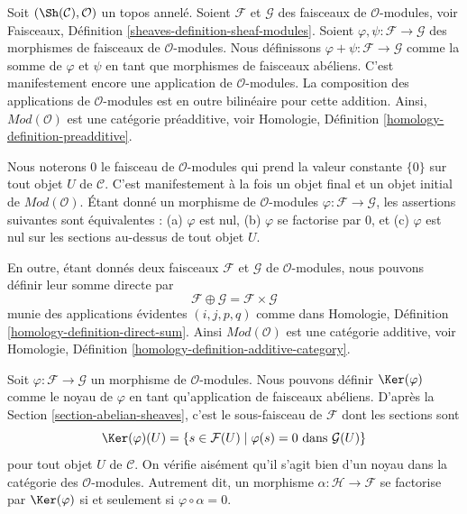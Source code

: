 \noindent
Soit $(\Sh(\mathcal{C}), \mathcal{O})$ un topos annelé. Soient
$\mathcal{F}$ et $\mathcal{G}$ des faisceaux de $\mathcal{O}$-modules, voir
Faisceaux, Définition \ref{sheaves-definition-sheaf-modules}. Soient
$\varphi, \psi : \mathcal{F} \to \mathcal{G}$ des morphismes de faisceaux de
$\mathcal{O}$-modules. Nous définissons
$\varphi + \psi : \mathcal{F} \to \mathcal{G}$ comme la somme de $\varphi$ et
$\psi$ en tant que morphismes de faisceaux abéliens. C'est manifestement encore
une application de $\mathcal{O}$-modules. La composition des applications de
$\mathcal{O}$-modules est en outre bilinéaire pour cette addition. Ainsi,
$\textit{Mod}(\mathcal{O})$ est une catégorie préadditive, voir Homologie,
Définition \ref{homology-definition-preadditive}.

\medskip\noindent
Nous noterons $0$ le faisceau de $\mathcal{O}$-modules qui prend la valeur
constante $\{0\}$ sur tout objet $U$ de $\mathcal{C}$. C'est manifestement à
la fois un objet final et un objet initial de $\textit{Mod}(\mathcal{O})$.
Étant donné un morphisme de $\mathcal{O}$-modules
$\varphi : \mathcal{F} \to \mathcal{G}$, les assertions suivantes sont
équivalentes : (a) $\varphi$ est nul, (b) $\varphi$ se factorise par $0$, et
(c) $\varphi$ est nul sur les sections au-dessus de tout objet $U$.

\medskip\noindent
En outre, étant donnés deux faisceaux $\mathcal{F}$ et $\mathcal{G}$ de
$\mathcal{O}$-modules, nous pouvons définir leur somme directe par
$$
\mathcal{F} \oplus \mathcal{G} = \mathcal{F} \times \mathcal{G}
$$
munie des applications évidentes $(i, j, p, q)$ comme dans Homologie,
Définition \ref{homology-definition-direct-sum}. Ainsi
$\textit{Mod}(\mathcal{O})$ est une catégorie additive, voir Homologie,
Définition \ref{homology-definition-additive-category}.

\medskip\noindent
Soit $\varphi : \mathcal{F} \to \mathcal{G}$ un morphisme de
$\mathcal{O}$-modules. Nous pouvons définir $\Ker(\varphi)$ comme le noyau de
$\varphi$ en tant qu'application de faisceaux abéliens. D'après la Section
\ref{section-abelian-sheaves}, c'est le sous-faisceau de $\mathcal{F}$ dont les
sections sont
$$
\Ker(\varphi)(U) =
\{ s \in \mathcal{F}(U) \mid \varphi(s) = 0 \text{ dans } \mathcal{G}(U)\}
$$
pour tout objet $U$ de $\mathcal{C}$. On vérifie aisément qu'il s'agit bien
d'un noyau dans la catégorie des $\mathcal{O}$-modules. Autrement dit, un
morphisme $\alpha : \mathcal{H} \to \mathcal{F}$ se factorise par
$\Ker(\varphi)$ si et seulement si $\varphi \circ \alpha = 0$.

